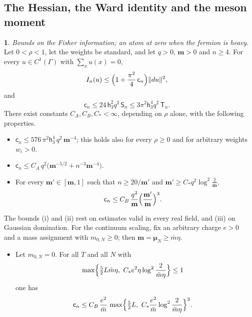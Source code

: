 \documentclass[11pt]{amsart}
\newcommand{\namedhead}{}
\theoremstyle{definition}
\newtheorem*{namedinner}{\namedhead}
\newenvironment{named}[1]{\renewcommand{\namedhead}{#1}\begin{namedinner}}{\end{namedinner}}
\begin{document}
\subsection{The Hessian, the Ward identity and the meson moment}
\begin{named}{Theorem 5.7}
\emph{Bounds on the Fisher information; an atom at zero when the fermion is heavy.}
Let $0<\rho<1$, let the weights be standard, and let $q>0$, $\mathbf m>0$ and $n\ge4$.
For every $u\in C^1(\Gamma)$ with $\sum_xu(x)=0$,
\begin{equation*}
I_n(u)\le\Bigl(1+\frac{\pi^2}{4}\,\mathsf c_n\Bigr)\|du\|^2,
\end{equation*}
and
\begin{equation*}
\mathsf c_n\le24\,\mathsf h_3^2q^2\,\mathsf S_n\le3\pi^2\mathsf h_3^4q^2\,\mathsf T_n.
\end{equation*}
There exist constants $C_A,C_B,C_*<\infty$, depending on $\rho$ alone, with the following properties.
\begin{itemize}
\item[(i)] $\mathsf c_n\le576\,\pi^2\mathsf h_3^4\,q^2\,\mathbf m^{-4}$; this holds also for every $\rho\ge0$ and for arbitrary weights $w_i>0$.
\item[(ii)] $\mathsf c_n\le C_A\,\allowbreak q^2\bigl(\mathbf m^{-5/2}+n^{-3}\mathbf m^{-4}\bigr)$.
\item[(iii)] For every $\mathbf m'\in[\mathbf m,1]$ such that $n\ge20/\mathbf m'$ and $\mathbf m'\ge C_*q^2\log^2\frac2{\mathbf m}$,
\begin{equation*}
\mathsf c_n\le C_B\,\frac{q^2}{\mathbf m}\Bigl(\frac{\mathbf m'}{\mathbf m}\Bigr)^3.
\end{equation*}
\end{itemize}
The bounds (i) and (ii) rest on estimates valid in every real field, and (iii) on Gaussian domination.
For the continuum scaling, fix an arbitrary charge $e>0$ and a mass assignment with $m_{0,N}\ge0$; then $\mathbf m=\boldsymbol\mu_N\ge\bar m\eta$.
\begin{itemize}
\item[(a)] Let $m_{0,N}=0$.
For all $T$ and all $N$ with
\begin{equation*}
\max\Bigl\{\tfrac52L\bar m\eta,\ C_*e^2\eta\log^2\frac{2}{\bar m\eta}\Bigr\}\le1
\end{equation*}
one has
\begin{equation*}
\mathsf c_n\le C_B\,\frac{e^2}{\bar m}\,\max\Bigl\{\tfrac52L,\ C_*\frac{e^2}{\bar m}\log^2\frac{2}{\bar m\eta}\Bigr\}^3.
\end{equation*}

\end{itemize}
\end{named}
\end{document}
